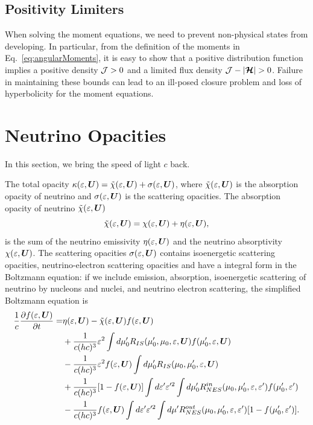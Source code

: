 \documentclass[10pt,preprint]{aastex}
\newcommand{\ee}[1]{{\color{red} #1}}
\begin{document}
\subsection{Positivity Limiters}
\label{sec:positivityLimiters}

When solving the moment equations, we need to prevent non-physical states from developing.  
In particular, from the definition of the moments in Eq.~\eqref{eq:angularMoments}, it is easy to show that a positive distribution function implies a positive density $\mathcal{J}>0$ and a limited flux density $\cJ-|\bcH|>0$.  
Failure in maintaining these bounds can lead to an ill-posed closure problem and loss of hyperbolicity for the moment equations.  

\section{Neutrino Opacities}
\label{sec:opacities}

In this section, we bring the speed of light $c$ back.

The total opacity $\kappa(\varepsilon,\boldsymbol{U})=\tilde{\chi}(\varepsilon,\boldsymbol{U})+\sigma(\varepsilon,\boldsymbol{U})$, where $\tilde{\chi}(\varepsilon,\boldsymbol{U})$ is the absorption opacity of neutrino and  $\sigma(\varepsilon,\boldsymbol{U})$ is the scattering opacities. 
The absorption opacity of neutrino $\tilde{\chi}(\varepsilon,\boldsymbol{U})$ 
\begin{equation}
  \tilde{\chi}(\varepsilon,\boldsymbol{U}) = \chi(\varepsilon,\boldsymbol{U}) + \eta(\varepsilon,\boldsymbol{U}), 
\end{equation}
 is the sum of the neutrino emissivity $\eta(\varepsilon,\boldsymbol{U}) $ and the neutrino absorptivity  $ \chi(\varepsilon,\boldsymbol{U})$. The scattering opacities $\sigma(\varepsilon,\boldsymbol{U})$ contains isoenergetic scattering opacities, neutrino-electron scattering opacities and have a integral form in the Boltzmann equation: if we include emission, absorption, isoenergetic scattering of neutrino by nucleons and nuclei, and neutrino electron scattering, the simplified Boltzmann equation is
\begin{align}
\dfrac{1}{c}\dfrac{\partial f(\varepsilon,\boldsymbol{U})}{\partial t} = 
&  \eta(\varepsilon,\boldsymbol{U}) - \tilde{\chi}(\varepsilon,\boldsymbol{U})f(\varepsilon,\boldsymbol{U}) \nonumber \\
& + \dfrac{1}{c(hc)^3} \varepsilon^2 \int d\mu^\prime_0 R_{IS}( \mu^\prime_0, \mu_0,\varepsilon, \boldsymbol{U}) f(\mu^\prime_0, \varepsilon,\boldsymbol{U}) \nonumber \\
& - \dfrac{1}{c(hc)^3} \varepsilon^2 f(\varepsilon,\boldsymbol{U})\int d\mu^\prime_0 R_{IS}(\mu_0, \mu^\prime_0, \varepsilon,\boldsymbol{U}) \nonumber \\
& + \dfrac{1}{c(hc)^3} [1- f(\varepsilon,\boldsymbol{U})] \int d\varepsilon^{\prime} \varepsilon^{\prime 2} \int d\mu^\prime_0 R^{in}_{NES} (\mu_0,\mu^\prime_0,\varepsilon,\varepsilon^{\prime} )f(\mu^\prime_0,\varepsilon^{\prime} ) \nonumber \\
& - \dfrac{1}{c(hc)^3} f(\varepsilon,\boldsymbol{U}) \int d\varepsilon^{\prime} \varepsilon^{\prime 2} \int d\mu^\prime R^{out}_{NES} (\mu_0,\mu^\prime_0,\varepsilon,\varepsilon^{\prime} ) [1-f(\mu^\prime_0,\varepsilon^{\prime} )] .
\end{align}
\end{document}
